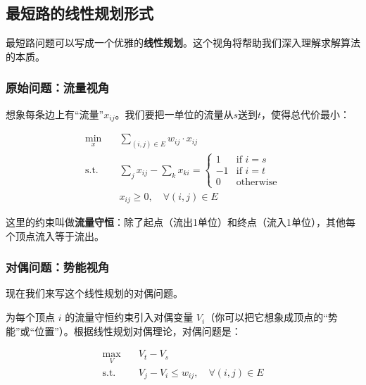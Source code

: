 \subsection{最短路的线性规划形式}

最短路问题可以写成一个优雅的\textbf{线性规划}。这个视角将帮助我们深入理解求解算法的本质。

\subsubsection{原始问题：流量视角}

想象每条边上有“流量”$x_{ij}$。我们要把一单位的流量从$s$送到$t$，使得总代价最小：

\begin{equation}
    \begin{aligned}
        \min_{x} \quad & \sum_{(i,j) \in E} w_{ij} \cdot x_{ij} \\
        \text{s.t.} \quad & \sum_{j} x_{ij} - \sum_{k} x_{ki} = \begin{cases}
            1 & \text{if } i = s \\
            -1 & \text{if } i = t \\
            0 & \text{otherwise}
        \end{cases} \\
        & x_{ij} \geq 0, \quad \forall (i,j) \in E
    \end{aligned}
\end{equation}

这里的约束叫做\textbf{流量守恒}：除了起点（流出1单位）和终点（流入1单位），其他每个顶点流入等于流出。

\subsubsection{对偶问题：势能视角}

现在我们来写这个线性规划的对偶问题。

为每个顶点 $i$ 的流量守恒约束引入对偶变量 $V_i$（你可以把它想象成顶点的“势能”或“位置”）。根据线性规划对偶理论，对偶问题是：

\begin{keyformula}[title=最短路的对偶问题]
\begin{equation}
    \begin{aligned}
        \max_{V} \quad & V_t - V_s \\
        \text{s.t.} \quad & V_j - V_i \leq w_{ij}, \quad \forall (i,j) \in E
    \end{aligned}
\end{equation}
\end{keyformula}

